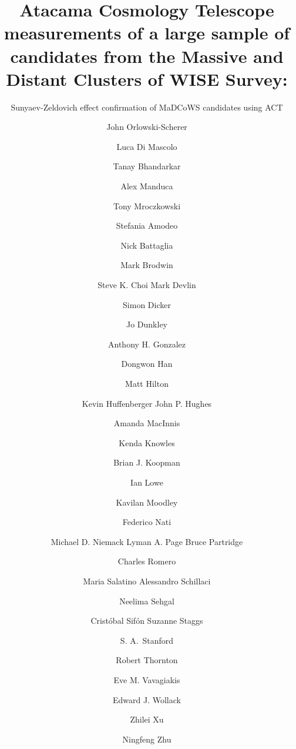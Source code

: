 \documentclass[longauth]{aa} %
\begin{document}
 


   \title{Atacama Cosmology Telescope measurements of a large sample of candidates from the Massive and Distant Clusters of WISE Survey:}
   \subtitle{Sunyaev-Zeldovich effect confirmation of MaDCoWS  candidates using ACT}

\author{John Orlowski-Scherer\and 
    Luca Di Mascolo\and
    Tanay Bhandarkar\and
    Alex Manduca\and
    Tony Mroczkowski\and 
    Stefania Amodeo \and
    Nick Battaglia \and
    Mark Brodwin\and
    Steve K. Choi
    Mark Devlin\and
    Simon Dicker\and
    Jo Dunkley\and
    Anthony H. Gonzalez\and
    Dongwon Han\and
    Matt Hilton\and
    Kevin Huffenberger
    John P. Hughes \and
    Amanda MacInnis\and
    Kenda Knowles  \and
    Brian J. Koopman\and
    Ian Lowe\and
    Kavilan Moodley\and
    Federico Nati \and
    Michael D. Niemack 
    Lyman A. Page
    Bruce Partridge\and
    Charles Romero\and
    Maria Salatino
    Alessandro Schillaci\and
    Neelima Sehgal\and
    Crist\'obal Sif\'on
    Suzanne Staggs\and
    S. A.\ Stanford\and
    Robert Thornton\and
    Eve M. Vavagiakis  \and
    Edward J. Wollack \and
    Zhilei Xu\and 
    Ningfeng Zhu
}
\end{document}
